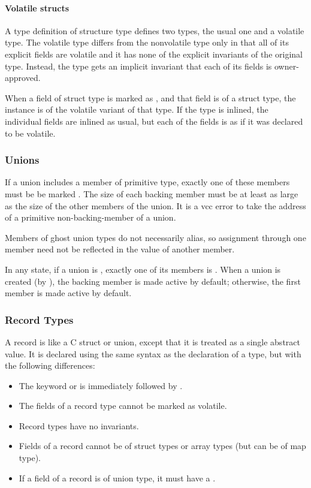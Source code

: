 \documentclass[preprint,nocopyrightspace]{sigplanconf}
\newcommand{\subsubsubsection}[1]{\paragraph{#1}}
\begin{document}
{{{\subsubsubsection{Volatile structs}
A type definition of structure type defines two types, the usual one
and a volatile type. The volatile type differs from the nonvolatile
type only in that all of its explicit fields are volatile and it has
none of the explicit invariants of the original type. Instead, the
type gets an implicit invariant that each of its fields is
owner-approved. 

When a field of struct type is marked as , and that
field is of a struct type, the instance is of the volatile variant of
that type. If the type is inlined, the individual fields are inlined
as usual, but each of the fields is as if it was declared to be
volatile. 

\subsubsection{Unions}
If a union includes a member of primitive type, exactly one of
these members must be be marked . The size of
each backing member must be at least as large as the size of the other
members of the union. It is a vcc error to take the address of a
primitive non-backing-member of a union. 

Members of ghost union types do not necessarily alias, so assignment
through one member need not be reflected in the value of another
member.  

In any state, if a union is \vcc{\valid}, exactly one of its members
is \vcc{\valid}. When a union is created (by \vcc{\unblobify}), the
backing member is made active by default; otherwise, the first member
is made active by default. 

\subsubsection{Record Types}
A record is like a C struct or union, except that it is treated as a single
abstract value. It is declared using the same syntax as the
declaration of a  type, but with the following
differences:
\begin{itemize}
\item The keyword  or  is immediately followed by
 .
\item The fields of a record type cannot be marked as volatile.
\item Record types have no invariants.
\item Fields of a record cannot be of struct types or array types (but
can be of map type). 
\item If a field of a record is of union type, it must have
a .
\end{itemize}

}}}
\end{document}
